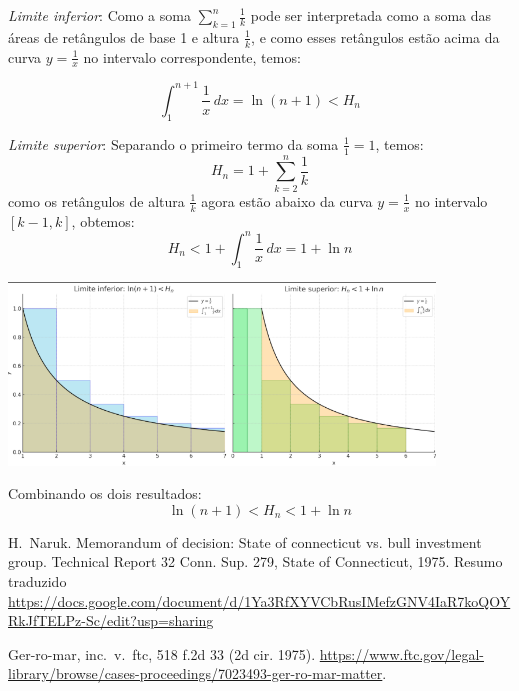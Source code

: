\documentclass[a4paper,12pt]{article}
\begin{document}
\medskip

\emph{Limite inferior}: Como a soma \( \sum_{k=1}^n \frac{1}{k} \) pode
ser interpretada como a soma das áreas de retângulos de base 1 e altura
\( \frac{1}{k} \), e como esses retângulos estão acima da curva
\( y = \frac{1}{x} \) no intervalo correspondente, temos:

\[
\int_1^{n+1} \frac{1}{x} \, dx = \ln(n+1) < H_n
\]

\medskip

\emph{Limite superior}: 
Separando o primeiro termo da soma \( \frac{1}{1} = 1 \), temos:
\[
H_n = 1 + \sum_{k=2}^n \frac{1}{k}
\]
como os retângulos de altura \( \frac{1}{k} \) agora estão abaixo
da curva \( y = \frac{1}{x} \) no intervalo \( [k-1, k] \), obtemos:
\[
H_n < 1 + \int_1^n \frac{1}{x} \, dx = 1 + \ln n
\]

    {\centering
    \includegraphics[width=0.85\textwidth]{harmonico.png}}

Combinando os dois resultados:
\[
\boxed{
\ln(n+1) < H_n < 1 + \ln n
}
\]






% 

\begin{thebibliography}{1}

 H.~Naruk.  \newblock Memorandum of decision: State of
  connecticut vs. bull investment group.  \newblock Technical Report 32
  Conn. Sup. 279, State of Connecticut, 1975. \newblock Resumo
  traduzido \url{https://docs.google.com/document/d/1Ya3RfXYVCbRusIMefzGNV4IaR7koQOYRkJfTELPz-Sc/edit?usp=sharing}

 Ger-ro-mar, inc.~v.~ftc, 518 f.2d 33 (2d
  cir. 1975).  \newblock
  \url{https://www.ftc.gov/legal-library/browse/cases-proceedings/7023493-ger-ro-mar-matter}.

\end{thebibliography}
\end{document}
